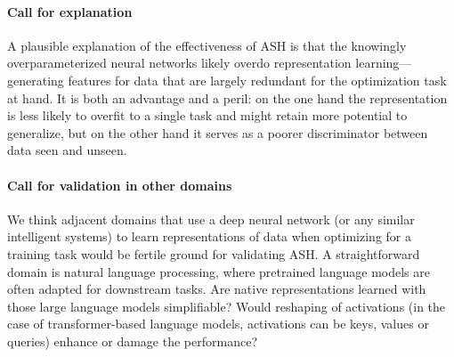 \documentclass{article}
\begin{document}
\paragraph{Call for explanation}
A plausible explanation of the effectiveness of ASH is that the knowingly overparameterized neural networks likely overdo representation learning—generating features for data that are largely redundant for the optimization task at hand. It is both an advantage and a peril: on the one hand the representation is less likely to overfit to a single task and might retain more potential to generalize, but on the other hand it serves as a poorer discriminator between data seen and unseen. 

\paragraph{Call for validation in other domains}
We think adjacent domains that use a deep neural network (or any similar intelligent systems) to learn representations of data when optimizing for a training task would be fertile ground for validating ASH. A straightforward domain is natural language processing, where pretrained language models are often adapted for downstream tasks. Are native representations learned with those large language models simplifiable? Would reshaping of activations (in the case of transformer-based language models, activations can be keys, values or queries) enhance or damage the performance?
\end{document}
